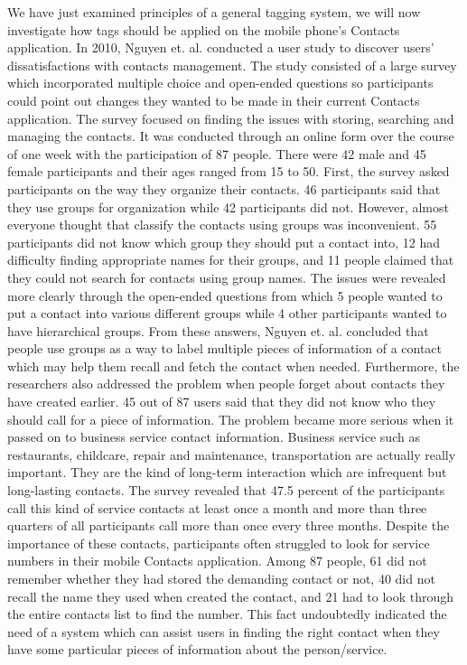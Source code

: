 We have just examined principles of a general tagging system, we will now investigate how tags should be applied on the mobile phone's Contacts application. In 2010, Nguyen et. al. conducted a user study \cite{tagging} to discover users' dissatisfactions with contacts management. The study consisted of a large survey which incorporated multiple choice and open-ended questions so participants could point out changes they wanted to be made in their current Contacts application. The survey focused on finding the issues with storing, searching and managing the contacts. It was conducted through an online form over the course of one week with the participation of 87 people. There were 42 male and 45 female participants and their ages ranged from 15 to 50. First, the survey asked participants on the way they organize their contacts. 46 participants said that they use groups for organization while 42 participants did not. However, almost everyone thought that classify the contacts using groups was inconvenient. 55 participants did not know which group they should put a contact into, 12 had difficulty finding appropriate names for their groups, and 11 people claimed that they could not search for contacts using group names. The issues were revealed more clearly through the open-ended questions from which 5 people wanted to put a contact into various different groups while 4 other participants wanted to have hierarchical groups. From these answers, Nguyen et. al. concluded that people use groups as a way to label multiple pieces of information of a contact which may help them recall and fetch the contact when needed. Furthermore, the researchers also addressed the problem when people forget about contacts they have created earlier. 45 out of 87 users said that they did not know who they should call for a piece of information. The problem became more serious when it passed on to business service contact information. Business service such as restaurants, childcare, repair and maintenance, transportation are actually really important. They are the kind of long-term interaction which are infrequent but long-lasting contacts. The survey revealed that 47.5 percent of the participants call this kind of service contacts at least once a month and more than three quarters of all participants call more than once every three months. Despite the importance of these contacts, participants often struggled to look for service numbers in their mobile Contacts application. Among 87 people, 61 did not remember whether they had stored the demanding contact or not, 40 did not recall the name they used when created the contact, and 21 had to look through the entire contacts list to find the number. This fact undoubtedly indicated the need of a system which can assist users in finding the right contact when they have some particular pieces of information about the person/service.

